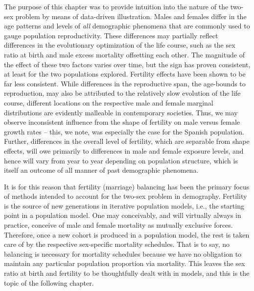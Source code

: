 \FloatBarrier

The purpose of this chapter was to provide intuition into the nature of the
two-sex problem by means of data-driven illustration. Males and females differ
in the age patterns and levels of \textit{all} demographic phenomena that are
commonly used to gauge population reproductivity. These differences may partially reflect
differences in the evolutionary optimization of the life course, such as the sex 
ratio at birth and male excess mortality offsetting each
other. The magnitude of the effect of these two factors varies over time, but
the sign has proven consistent, at least for the two populations explored.
Fertility effects have been shown to be far less consistent. While differences
in the reproductive span, the age-bounds to reproduction, may also be attributed
to the relatively slow evolution of the life course, different locations on the
respective male and female marginal distributions are evidently malleable in
contemporary societies. Thus, we may observe inconsistent influence from the shape of
fertility on male versus female growth rates -- this, we note, was especially
the case for the Spanish population. Further, differences in the
overall level of fertility, which are separable from shape effects, will 
owe primarily to differences in male and female exposure levels, and hence will vary
from year to year depending on population structure, which is itself an outcome
of all manner of past demographic phenomena.

It is for this reason that fertility (marriage) balancing has been the primary
focus of methods intended to account for the two-sex problem in demography.
Fertility is the source of new generations in iterative population models, i.e.,
the starting point in a population model. One may conceivably, and will virtually
always in practice, conceive of male and female mortality as mutually
exclusive forces. Therefore, once a new cohort is produced in a population
model, the rest is taken care of by the respective sex-specific mortality
schedules. That is to say, no balancing is necessary for mortality schedules
because we have no obligation to maintain any particular population
proportion via mortality. This leaves the sex ratio at birth and fertility to
be thoughtfully dealt with in models, and this is the topic of the following
chapter.
